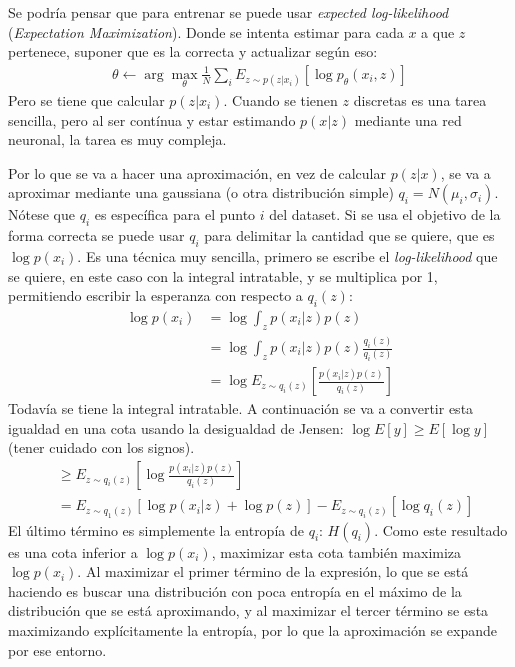 Se podría pensar que para entrenar se puede usar \textit{expected log-likelihood}
(\textit{Expectation Maximization}). Donde se intenta estimar para cada $x$ a que $z$ pertenece,
suponer que es la correcta y actualizar según eso:
\begin{align}
\theta \leftarrow \operatorname { arg } \operatorname { max } _ { \theta } \frac { 1 } { N } \sum _ { i } E _ { z \sim p ( z | x _ { i } ) } [ \operatorname { log } p _ { \theta } ( x _ { i } , z ) ]
\end{align}
Pero se tiene que calcular $p(z|x_i)$. Cuando se tienen $z$ discretas es una tarea sencilla, pero
al ser contínua y estar estimando $p(x|z)$ mediante una red neuronal, la tarea es muy
compleja.

Por lo que se va a hacer una aproximación, en vez de calcular  $p(z|x)$, se va a aproximar
mediante una gaussiana (o otra distribución simple) $q_i=N(\mu_i,\sigma_i)$. Nótese que $q_i$ es específica para el
punto $i$ del dataset. Si se usa el objetivo de la forma correcta se puede usar $q_i$ para
delimitar la cantidad que se quiere, que es $\log p(x_i)$. Es una técnica muy sencilla,
primero se escribe el \textit{log-likelihood} que se quiere, en este caso con la integral
intratable, y se multiplica por 1, permitiendo escribir la esperanza con respecto a $q_i(z)$:
\begin{align}
    \operatorname { log } p ( x _ { i } ) &= \operatorname { log } \int _ { z } p ( x _ { i } | z
    ) p ( z )\\
                                          &=\log\int_z p(x_i|z)p(z)
                                          \frac{q_i(z)}{q_i(z)}\\
                                          &=\log E_{z\sim q_i(z)}\left[
                                          \frac{p(x_i|z)p(z)}{q_i(z)} \right]
\end{align}
Todavía se tiene la integral intratable. A continuación se va a convertir esta igualdad en una
cota usando la desigualdad de Jensen: $\log E[y]\geq E[\log y]$ (tener cuidado con los
signos).
\begin{align}
    &\geq E_{z\sim q_i(z)}\left[\log \frac{p(x_i|z)p(z)}{q_i(z)} \right]\\
    &= E _ { z \sim q _ { 1 } ( z ) } [ \operatorname { log } p ( x _ { i } | z ) + \operatorname { log } p ( z ) ] - E _ { z \sim q _ { i } ( z ) } [ \operatorname { log } q _ { i } ( z ) ]
\end{align}
El último término es simplemente la entropía de $q_i $: $H(q_i)$. Como este resultado es una
cota inferior a  $\log p(x_i)$, maximizar esta cota también maximiza $\log p(x_i)$.
Al maximizar el primer término de la expresión, lo que se está haciendo es buscar una
distribución con poca entropía en el máximo de la distribución que se está aproximando, y al
maximizar el tercer término se esta maximizando explícitamente la entropía, por lo que la
aproximación se expande por ese entorno.

